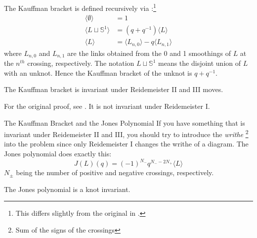 \documentclass{beamer}
\begin{document}
    \begin{frame}
        The Kauffman bracket is defined recursively via
        \cite[p.~338-339]{BarNatanKhovanovJones}:\footnote{%
            This differs slightly from the original in
            \cite[p.~396]{KauffmanStateModels}.
        }
        \begin{align}
            \langle\emptyset\rangle&=1\\
            \langle{L\sqcup\mathbb{S}^{1}}\rangle&=(q+q^{-1})\langle{L}\rangle\\
            \langle{L}\rangle&=
                \langle{L_{n,0}}\rangle-q\langle{L_{n,1}}\rangle
        \end{align}
        where $L_{n,0}$ and $L_{n,1}$ are the links obtained from the
        0 and 1 smoothings of $L$ at the $n^{th}$ crossing, respectively. The
        notation $L\sqcup\mathbb{S}^{1}$ means the disjoint union of
        $L$ with an unknot. Hence the Kauffman bracket of the
        unknot is $q+q^{-1}$.
        \begin{theorem}
            The Kauffman bracket is invariant under Reidemeister II and III
            moves.
        \end{theorem}
        For the original proof, see \cite[p.~397-398]{KauffmanStateModels}.
        It is not invariant under Reidemeister I.
    \end{frame}
    \begin{frame}{The Kauffman Bracket and the Jones Polynomial}
        If you have something that is invariant under Reidemeister II and III,
        you should try to introduce the \textit{writhe}%
        \footnote{Sum of the signs of the crossings}
        into the problem since only Reidemeister I changes the writhe of a
        diagram. The Jones polynomial does exactly this:
        \begin{equation}
            J(L)(q)=(-1)^{N_{-}}q^{N_{-}-2N_{+}}\langle{L}\rangle
        \end{equation}
        $N_{\pm}$ being the number of positive and negative crossings,
        respectively.
        \begin{theorem}
            The Jones polynomial is a knot invariant.
        \end{theorem}
    \end{frame}
\end{document}
